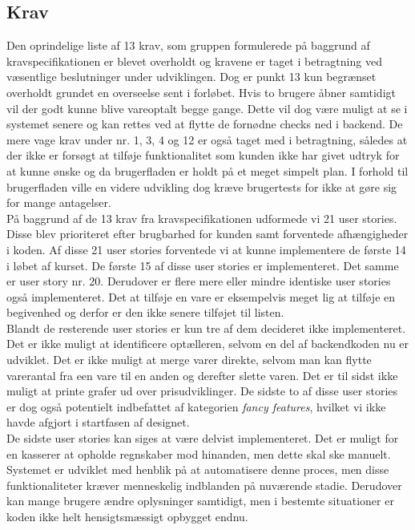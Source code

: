 \documentclass[]{article}
\begin{document}
\subsection{Krav}
Den oprindelige liste af 13 krav, som gruppen formulerede på baggrund af kravspecifikationen er blevet overholdt og kravene er taget i betragtning ved væsentlige beslutninger under udviklingen. Dog er punkt 13 kun begrænset overholdt grundet en overseelse sent i forløbet. Hvis to brugere åbner samtidigt vil der godt kunne blive vareoptalt begge gange. Dette vil dog være muligt at se i systemet senere og kan rettes ved at flytte de fornødne checks ned i backend. De mere vage krav under nr. 1, 3, 4 og 12 er også taget med i betragtning, således at der ikke er forsøgt at tilføje funktionalitet som kunden ikke har givet udtryk for at kunne ønske og da brugerfladen er holdt på et meget simpelt plan. I forhold til brugerfladen ville en videre udvikling dog kræve brugertests for ikke at gøre sig for mange antagelser. \\ 
\indent På baggrund af de 13 krav fra kravspecifikationen udformede vi 21 user stories. Disse blev prioriteret efter brugbarhed for kunden samt forventede afhængigheder i koden. Af disse 21 user stories forventede vi at kunne implementere de første 14 i løbet af kurset. De første 15 af disse user stories er implementeret. Det samme er user story nr. 20. Derudover er flere mere eller mindre identiske user stories også implementeret. Det at tilføje en vare er eksempelvis meget lig at tilføje en begivenhed og derfor er den ikke senere tilføjet til listen. \\ 
\indent Blandt de resterende user stories er kun tre af dem decideret ikke implementeret. Det er ikke muligt at identificere optælleren, selvom en del af backendkoden nu er udviklet. Det er ikke muligt at merge varer direkte, selvom man kan flytte varerantal fra een vare til en anden og derefter slette varen. Det er til sidst ikke muligt at printe grafer ud over prisudviklinger. De sidste to af disse user stories er dog også potentielt indbefattet af kategorien \textit{fancy features}, hvilket vi ikke havde afgjort i startfasen af designet. \\ 
\indent De sidste user stories kan siges at være delvist implementeret. Det er muligt for en kasserer at opholde regnskaber mod hinanden, men dette skal ske manuelt. Systemet er udviklet med henblik på at automatisere denne proces, men disse funktionaliteter kræver menneskelig indblanden på nuværende stadie. Derudover kan mange brugere ændre oplysninger samtidigt, men i bestemte situationer er koden ikke helt hensigtsmæssigt opbygget endnu. 
\end{document}
